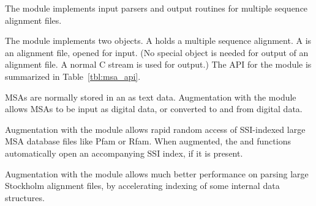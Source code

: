 The  module implements input parsers and output routines
for multiple sequence alignment files. 

The module implements two objects. A  holds a multiple
sequence alignment. A  is an alignment file,
opened for input. (No special object is needed for output of an
alignment file. A normal C  stream is used for output.)
The API for the  module is summarized in
Table~\ref{tbl:msa_api}.

MSAs are normally stored in an  as text data.
Augmentation with the  module allows MSAs to be input
as digital data, or converted to and from digital data. 

Augmentation with the  module allows rapid random access
of SSI-indexed large MSA database files like Pfam or Rfam. When
augmented, the  and
 functions automatically open an
accompanying SSI index, if it is present.

Augmentation with the  module allows much better
performance on parsing large Stockholm alignment files, by
accelerating indexing of some internal data structures.

